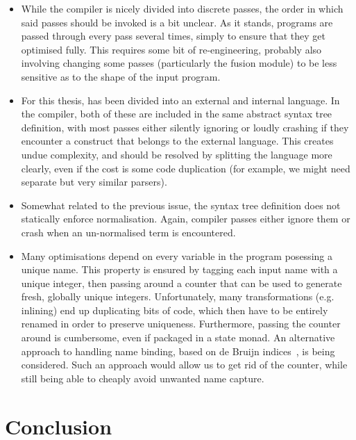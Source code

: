 \begin{itemize}
\item While the compiler is nicely divided into discrete passes, the
  order in which said passes should be invoked is a bit unclear.  As
  it stands, programs are passed through every pass several times,
  simply to ensure that they get optimised fully.  This requires some
  bit of re-engineering, probably also involving changing some passes
  (particularly the fusion module) to be less sensitive as to the
  shape of the input program.

\item For this thesis, \LO{} has been divided into an external and
  internal language.  In the compiler, both of these are included in
  the same abstract syntax tree definition, with most passes either
  silently ignoring or loudly crashing if they encounter a construct
  that belongs to the external language.  This creates undue
  complexity, and should be resolved by splitting the language more
  clearly, even if the cost is some code duplication (for example, we
  might need separate but very similar parsers).

\item Somewhat related to the previous issue, the \LO{} syntax tree
  definition does not statically enforce normalisation.  Again,
  compiler passes either ignore them or crash when an un-normalised
  term is encountered.

\item Many optimisations depend on every variable in the program
  posessing a unique name.  This property is ensured by tagging each
  input name with a unique integer, then passing around a counter that
  can be used to generate fresh, globally unique integers.
  Unfortunately, many transformations (e.g. inlining) end up
  duplicating bits of code, which then have to be entirely renamed in
  order to preserve uniqueness.  Furthermore, passing the counter
  around is cumbersome, even if packaged in a state monad.  An
  alternative approach to handling name binding, based on de Bruijn
  indices~\cite{McBride:2004:FPI:1017472.1017477}, is being
  considered.  Such an approach would allow us to get rid of the
  counter, while still being able to cheaply avoid unwanted name
  capture.
\end{itemize}

\section{Conclusion}
\label{sec:conclusion}


